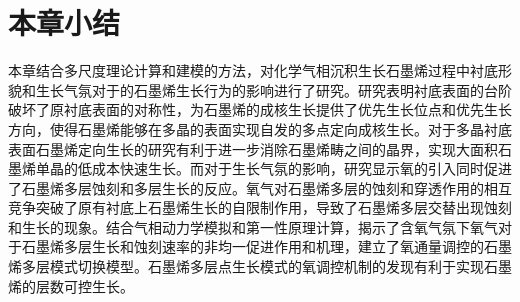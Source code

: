 \section{本章小结}
本章结合多尺度理论计算和建模的方法，对化学气相沉积生长石墨烯过程中衬底形貌和生长气氛对于的石墨烯生长行为的影响进行了研究。研究表明衬底表面的台阶破坏了原衬底表面的对称性，为石墨烯的成核生长提供了优先生长位点和优先生长方向，使得石墨烯能够在多晶的表面实现自发的多点定向成核生长。对于多晶衬底表面石墨烯定向生长的研究有利于进一步消除石墨烯畴之间的晶界，实现大面积石墨烯单晶的低成本快速生长。而对于生长气氛的影响，研究显示氧的引入同时促进了石墨烯多层蚀刻和多层生长的反应。氧气对石墨烯多层的蚀刻和穿透作用的相互竞争突破了原有衬底上石墨烯生长的自限制作用，导致了石墨烯多层交替出现蚀刻和生长的现象。结合气相动力学模拟和第一性原理计算，揭示了含氧气氛下氧气对于石墨烯多层生长和蚀刻速率的非均一促进作用和机理，建立了氧通量调控的石墨烯多层模式切换模型。石墨烯多层点生长模式的氧调控机制的发现有利于实现石墨烯的层数可控生长。
